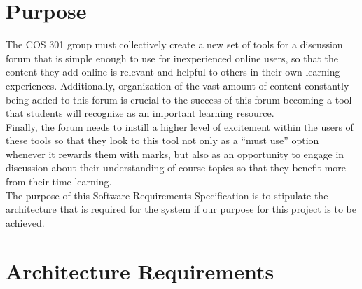\documentclass[hidelinks, 12pt]{article}
\begin{document}
\section{Purpose}
The COS 301 group must collectively create a new set of tools for a discussion forum that is simple enough to use for inexperienced online users, so that the content they add online is relevant and helpful to others in their own learning experiences. 
Additionally, organization of the vast amount of content constantly being added to this forum is crucial to the success of this forum becoming a tool that students will recognize as an important learning resource.\\ 
Finally, the forum needs to instill a higher level of excitement within the users of these tools so that they look to this tool not only as a “must use” option whenever it rewards them with marks, but also as an opportunity to engage in discussion about their understanding of course topics so that they benefit more from their time learning.\\
The purpose of this Software Requirements Specification is to stipulate the architecture that is required for the system if our purpose for this project is to be achieved.

\section{Architecture Requirements}

\end{document}

